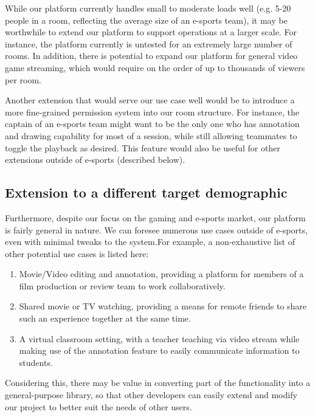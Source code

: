 \documentclass[conference]{IEEEtran}
\begin{document}
    While our platform currently handles small to moderate loads well (e.g. 5-20 people in a room, reflecting the average size of an e-sports team), it may be worthwhile to extend our platform to support operations at a larger scale. For instance, the platform currently is untested for an extremely large number of rooms. In addition, there is potential to expand our platform for general video game streaming, which would require on the order of up to thousands of viewers per room.

    Another extension that would serve our use case well would be to introduce a more fine-grained permission system into our room structure. For instance, the captain of an e-sports team might want to be the only one who has annotation and drawing capability for most of a session, while still allowing teammates to toggle the playback as desired. This feature would also be useful for other extensions outside of e-sports (described below).

\subsection{Extension to a different target demographic}

  Furthermore, despite our focus on the gaming and e-sports market, our platform is fairly general in nature. We can foresee numerous use cases outside of e-sports, even with minimal tweaks to the system.For example, a non-exhaustive list of other potential use cases is listed here:

  \begin{enumerate}
      \item Movie/Video editing and annotation, providing a platform for members of a film production or review team to work collaboratively.

      \item Shared movie or TV watching, providing a means for remote friends to share such an experience together at the same time.

      \item A virtual classroom setting, with a teacher teaching via video stream while making use of the annotation feature to easily communicate information to students.
  \end{enumerate}

   Considering this, there may be value in converting part of the functionality into a general-purpose library, so that other developers can easily extend and modify our project to better suit the needs of other users.
\end{document}

